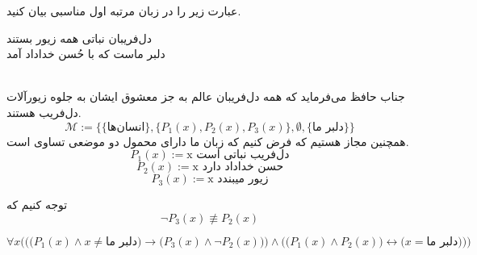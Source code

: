 
	عبارت زیر را در زبان مرتبه اول مناسبی بیان کنید.
	\begin{center}
		دل‌فریبان نباتی همه زیور بستند\\ دلبر ماست که با حُسن خداداد آمد
	\end{center}
	
	\quad\vspace{0.5 cm}
	\begin{ans}
		\\جناب حافظ می‌فرماید که همه دل‌فریبان عالم به جز معشوق ایشان به جلوه زیورآلات دل‌فریب هستند.
	$$
		\mathcal{M} := \{\{\text{انسان‌ها}\}, \{P_1(x), P_2(x), P_3(x)\}, \emptyset, \{\text{دلبر ما}\}\}
	$$
	همچنین مجاز هستیم که فرض کنیم که زبان ما دارای محمول دو موضعی تساوی است.
	$$
		{P_1}(x) := \text{x دل‌فریب نباتی است}
	$$
	$$
		{P_2}(x) := \text{x حسن خداداد دارد}
	$$
	$$
		{P_3}(x) := \text{x زیور میبندد}
	$$
	
	
	توجه کنیم که
	$$\neg {P_3}(x) \nequiv {P_2}(x)$$
	
	$$
	\forall x \Bigg(\bigg(\Big(P_1(x)\wedge x \neq \text {دلبر ما}\Big) \rightarrow \Big({P_3}(x) \wedge \neg P_2(x)\Big)\bigg) \wedge \bigg(\Big({P_1}(x) \wedge {P_2}(x)\Big) \leftrightarrow \Big(x = \text{دلبر ما} \Big) \bigg)\Bigg)
	$$
	
	\end{ans}
